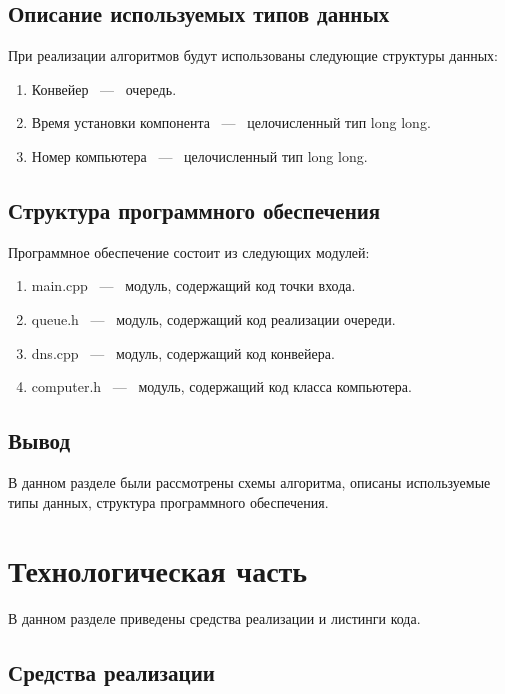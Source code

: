 \subsection{Описание используемых типов данных}

При реализации алгоритмов будут использованы следующие структуры данных:

\begin{enumerate}
    \item Конвейер ~---~ очередь.
    \item Время установки компонента ~---~ целочисленный тип long long.
    \item Номер компьютера ~---~ целочисленный тип long long.
\end{enumerate}

\subsection{Структура программного обеспечения}

Программное обеспечение состоит из следующих модулей:

\begin{enumerate}
    \item main.cpp ~---~ модуль, содержащий код точки входа.
    \item queue.h  ~---~ модуль, содержащий код реализации очереди.
    \item dns.cpp  ~---~ модуль, содержащий код конвейера.
    \item computer.h ~---~ модуль, содержащий код класса компьютера.
\end{enumerate}

\subsection{Вывод}

В данном разделе были рассмотрены схемы алгоритма, описаны используемые типы данных, структура программного обеспечения.

\section{Технологическая часть}

В данном разделе приведены средства реализации и листинги кода.

\subsection{Средства реализации}

